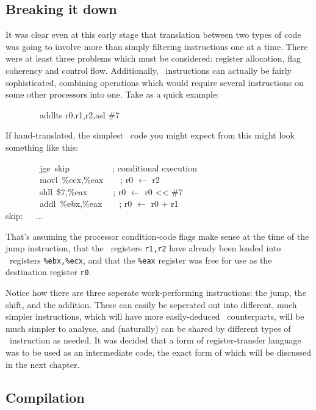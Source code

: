 \subsection{Breaking it down}

It was clear even at this early stage that translation between two types of code was going to involve more than simply filtering instructions one at a time. There were at least three problems which must be considered: register allocation, flag coherency and control flow. Additionally, \arm\ instructions can actually be fairly sophisticated, combining operations which would require several instructions on some other processors into one. Take as a quick example:

\begin{code}
~~~~~~~~addlts r0,r1,r2,asl \#7
\end{code}

If hand-translated, the simplest \ia\ code you might expect from this might look something like this:

\begin{code}
~~~~~~~~jge~skip~~~~~~~~~~; conditional execution\\
~~~~~~~~movl~\%ecx,\%eax~~~~; r0 $\leftarrow$ r2\\
~~~~~~~~shll~\$7,\%eax~~~~~~; r0 $\leftarrow$ r0 << \#7\\
~~~~~~~~addl~\%ebx,\%eax~~~~; r0 $\leftarrow$ r0 + r1\\
skip:~~~...
\end{code}

That's assuming the processor condition-code flags make sense at the time of the jump instruction, that the \arm\ registers {\tt r1,r2} have already been loaded into \ia\ registers {\tt \%ebx,\%ecx}, and that the {\tt \%eax} register was free for use as the destination register {\tt r0}.

Notice how there are three seperate work-performing instructions: the jump, the shift, and the addition. These can easily be seperated out into different, much simpler instructions, which will have more easily-deduced \ia\ counterparts, will be much simpler to analyse, and (naturally) can be shared by different types of \arm\ instruction as needed. It was decided that a form of register-transfer language was to be used as an intermediate code, the exact form of which will be discussed in the next chapter.

\subsection{Compilation}

